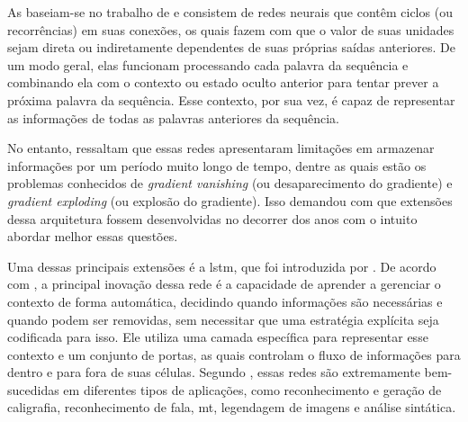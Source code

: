 As  baseiam-se no trabalho de  e consistem de redes neurais que contêm ciclos (ou recorrências) em suas conexões, os quais fazem com que o valor de suas unidades sejam direta ou indiretamente dependentes de suas próprias saídas anteriores.
De um modo geral, elas funcionam processando cada palavra da sequência e combinando ela com o contexto ou estado oculto anterior para tentar prever a próxima palavra da sequência. Esse contexto, por sua vez, é capaz de representar as informações de todas as palavras anteriores da sequência.


No entanto,  ressaltam que essas redes apresentaram limitações em armazenar informações por um período muito longo de tempo, dentre as quais estão os problemas conhecidos de \textit{gradient vanishing} (ou desaparecimento do gradiente) e \textit{gradient exploding} (ou explosão do gradiente). Isso demandou com que extensões dessa arquitetura fossem desenvolvidas no decorrer dos anos com o intuito abordar melhor essas questões.


Uma dessas principais extensões é a \acrshort{lstm}, que foi introduzida por . De acordo com , a principal inovação dessa rede é a capacidade de aprender a gerenciar o contexto de forma automática, decidindo quando informações são necessárias e quando podem ser removidas, sem necessitar que uma estratégia explícita seja codificada para isso. Ele utiliza uma camada específica para representar esse contexto e um conjunto de portas, as quais controlam o fluxo de informações para dentro e para fora de suas células.
Segundo , essas redes são extremamente bem-sucedidas em diferentes tipos de aplicações, como reconhecimento e geração de caligrafia, reconhecimento de fala, \acrfull{mt}, legendagem de imagens e análise sintática.

